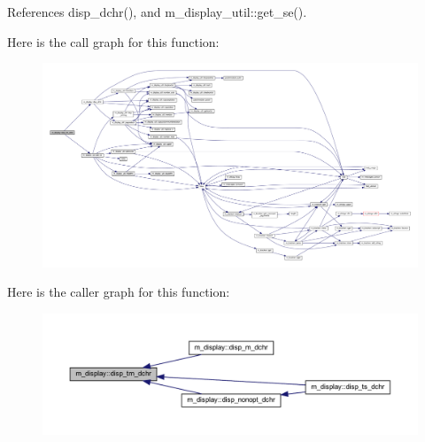 References disp\+\_\+dchr(), and m\+\_\+display\+\_\+util\+::get\+\_\+se().

Here is the call graph for this function\+:
\nopagebreak
\begin{figure}[H]
\begin{center}
\leavevmode
\includegraphics[width=350pt]{namespacem__display_a617f15809ebffb2f8182db80523dd291_cgraph}
\end{center}
\end{figure}
Here is the caller graph for this function\+:
\nopagebreak
\begin{figure}[H]
\begin{center}
\leavevmode
\includegraphics[width=350pt]{namespacem__display_a617f15809ebffb2f8182db80523dd291_icgraph}
\end{center}
\end{figure}
\mbox{\label{namespacem__display_a0b5f8c9a84f77bedd9b8e6cd6bb8a093}} 
